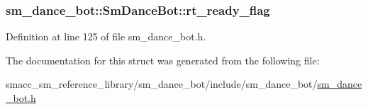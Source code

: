 \subsubsection[{\texorpdfstring{rt\+\_\+ready\+\_\+flag}{rt_ready_flag}}]{ sm\+\_\+dance\+\_\+bot\+::\+Sm\+Dance\+Bot\+::rt\+\_\+ready\+\_\+flag}\hypertarget{structsm__dance__bot_1_1SmDanceBot_a0f0587a13670ad8925555cd8f6cb6b2d}{}\label{structsm__dance__bot_1_1SmDanceBot_a0f0587a13670ad8925555cd8f6cb6b2d}


Definition at line 125 of file sm\+\_\+dance\+\_\+bot.\+h.



The documentation for this struct was generated from the following file\+:\begin{DoxyCompactItemize}
\item 
smacc\+\_\+sm\+\_\+reference\+\_\+library/sm\+\_\+dance\+\_\+bot/include/sm\+\_\+dance\+\_\+bot/\hyperlink{sm__dance__bot_8h}{sm\+\_\+dance\+\_\+bot.\+h}\end{DoxyCompactItemize}
